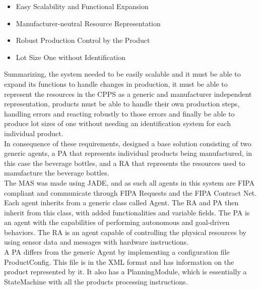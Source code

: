 \begin{itemize}
	\item Easy Scalability and Functional Expansion
	\item Manufacturer-neutral Resource Representation
	\item Robust Production Control by the Product
	\item Lot Size One without Identification
\end{itemize}

Summarizing, the system needed to be easily scalable and it must be able to expand its functions to handle changes in production, it must be able to represent the resources in the \acrshort{CPPS} as a generic and manufacturer independent representation, products must be able to handle their own production steps, handling errors and reacting robustly to those errors and finally be able to produce lot sizes of one without needing an identification system for each individual product.\\

In consequence of these requirements, \citeauthor{bottling_plant_part1} designed a base solution consisting of two generic agents, a \acrfull{PA} that represents individual products being manufactured, in this case the beverage bottles, and a \acrfull{RA} that represents the resources used to manufacture the beverage bottles.\\

The \acrshort{MAS} was made using \acrshort{JADE}, and as such all agents in this system are \acrshort{FIPA} compliant and communicate through \acrshort{FIPA} Requests and the \acrshort{FIPA} Contract Net.\\

Each agent inherits from a generic class called Agent. The \acrshort{RA} and \acrshort{PA} then inherit from this class, with added functionalities and variable fields. The \acrshort{PA} is an agent with the capabilities of performing autonomous and goal-driven behaviors. The \acrshort{RA} is an agent capable of controlling the physical resources by using sensor data and messages with hardware instructions.\\

A \acrshort{PA} differs from the generic Agent by implementing a configuration file ProductConfig. This file is in the \acrshort{XML} format and has information on the product represented by it. It also has a PlanningModule, which is essentially a StateMachine with all the products processing instructions.\\

